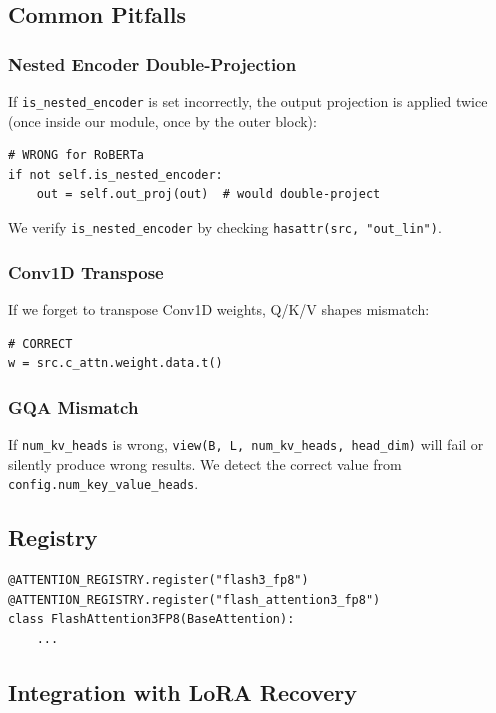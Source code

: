 \subsection{Common Pitfalls}

\subsubsection{Nested Encoder Double-Projection}

If \texttt{is\_nested\_encoder} is set incorrectly, the output projection is applied 
twice (once inside our module, once by the outer block):

\begin{lstlisting}
# WRONG for RoBERTa
if not self.is_nested_encoder:
    out = self.out_proj(out)  # would double-project
\end{lstlisting}

We verify \texttt{is\_nested\_encoder} by checking \texttt{hasattr(src, "out\_lin")}.

\subsubsection{Conv1D Transpose}

If we forget to transpose Conv1D weights, Q/K/V shapes mismatch:

\begin{lstlisting}
# CORRECT
w = src.c_attn.weight.data.t()
\end{lstlisting}

\subsubsection{GQA Mismatch}

If \texttt{num\_kv\_heads} is wrong, \texttt{view(B, L, num\_kv\_heads, head\_dim)} will fail 
or silently produce wrong results. We detect the correct value from 
\texttt{config.num\_key\_value\_heads}.

\subsection{Registry}

\begin{lstlisting}
@ATTENTION_REGISTRY.register("flash3_fp8")
@ATTENTION_REGISTRY.register("flash_attention3_fp8")
class FlashAttention3FP8(BaseAttention):
    ...
\end{lstlisting}

\subsection{Integration with LoRA Recovery}

